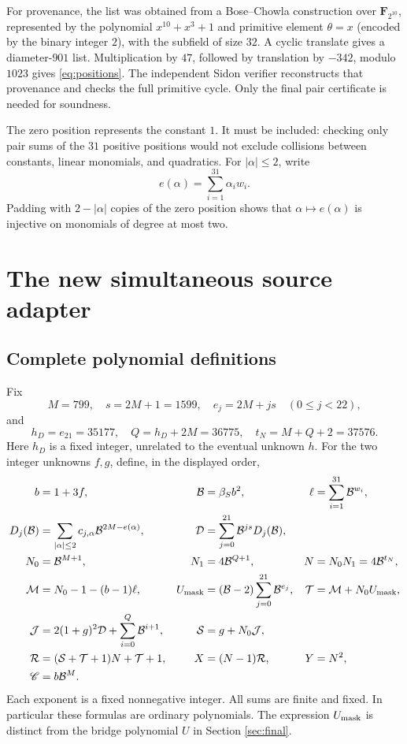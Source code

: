 \documentclass[11pt,a4paper]{article}
\theoremstyle{remark}
\newcommand{\B}{\mathcal B}
\newcommand{\Dc}{\mathcal D}
\newcommand{\Mc}{\mathcal M}
\newcommand{\Tc}{\mathcal T}
\newcommand{\Jc}{\mathcal J}
\newcommand{\Sc}{\mathcal S}
\newcommand{\Rc}{\mathcal R}
\renewcommand{\Cap}{\mathscr C}
\begin{document}
For provenance, the list was obtained from a Bose--Chowla construction
over \(\mathbf F_{2^{10}}\), represented by the polynomial
\(x^{10}+x^3+1\) and primitive element \(\theta=x\)
(encoded by the binary integer \(2\)), with the subfield of size
\(32\). A cyclic translate gives a diameter-\(901\) list. Multiplication
by \(47\), followed by translation by \(-342\), modulo \(1023\) gives
\eqref{eq:positions}. The independent Sidon verifier reconstructs that
provenance and checks the full primitive cycle. Only the final pair
certificate is needed for soundness.

The zero position represents the constant \(1\). It must be included:
checking only pair sums of the \(31\) positive positions would not
exclude collisions between constants, linear monomials, and quadratics.
For \(|\alpha|\le2\), write
\[
e(\alpha)=\sum_{i=1}^{31}\alpha_iw_i.
\]
Padding with \(2-|\alpha|\) copies of the zero position shows that
\(\alpha\mapsto e(\alpha)\) is injective on monomials of degree at most
two.

\section{The new simultaneous source adapter}\label{sec:source}
\subsection{Complete polynomial definitions}
Fix
\[
M=799,\quad s=2M+1=1599,\quad e_j=2M+js\quad(0\le j<22),
\]
and
\[
h_D=e_{21}=35177,\quad Q=h_D+2M=36775,\quad
t_N=M+Q+2=37576.
\]
Here \(h_D\) is a fixed integer, unrelated to the eventual unknown \(h\).
For the two integer unknowns \(f,g\), define, in the displayed order,
\begin{align}
b&=1+3f,&\B&=\beta_S b^2,&
\ell&=\sum_{i=1}^{31}\B^{w_i},\label{eq:base}\\
D_j(\B)&=\sum_{|\alpha|\le2}
c_{j,\alpha}\B^{2M-e(\alpha)},&
\Dc&=\sum_{j=0}^{21}\B^{js}D_j(\B),\label{eq:Dcode}\\
N_0&=\B^{M+1},&N_1&=4\B^{Q+1},&
N&=N_0N_1=4\B^{t_N},\label{eq:N}\\
\Mc&=N_0-1-(b-1)\ell,&
U_{\rm mask}&=(\B-2)\sum_{j=0}^{21}\B^{e_j},&
\Tc&=\Mc+N_0U_{\rm mask},\label{eq:mask}\\
\Jc&=2(1+g)^2\Dc+\sum_{i=0}^{Q}\B^{i+1},&
\Sc&=g+N_0\Jc,\label{eq:JS}\\
\Rc&=(\Sc+\Tc+1)N+\Tc+1,&
X&=(N-1)\Rc,&Y&=N^2,\label{eq:XY}\\
\Cap&=b\B^M.&&&&\label{eq:cap}
\end{align}
Each exponent is a fixed nonnegative integer. All sums are finite and
fixed. In particular these formulas are ordinary polynomials.
The expression \(U_{\rm mask}\) is distinct from the bridge polynomial
\(U\) in Section \ref{sec:final}.
\end{document}
